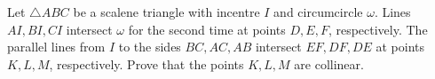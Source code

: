 Let $\triangle{ABC}$ be a scalene triangle with incentre $I$ and circumcircle $\omega$. Lines $AI, BI, CI$ intersect $\omega$ for the second time at points $D, E, F$,  respectively. The parallel lines from $I$ to the sides $BC, AC, AB$ intersect $EF, DF, DE$ at points $K, L, M$,  respectively. Prove that the points $K, L, M$ are collinear.

